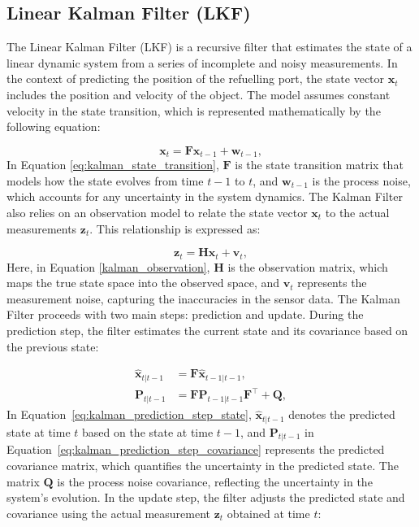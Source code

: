 \documentclass[12pt,oneside]{book} %
\begin{document}
\subsection*{Linear Kalman Filter (LKF)}
\noindent The Linear Kalman Filter (LKF) is a recursive filter that estimates the state of a linear dynamic system from a series of incomplete and noisy measurements. In the context of predicting the position of the refuelling port, the state vector $\mathbf{x}_t$ includes the position and velocity of the object. The model assumes constant velocity in the state transition, which is represented mathematically by the following equation:

\begin{equation}
    \mathbf{x}_t = \mathbf{F} \mathbf{x}_{t-1} + \mathbf{w}_{t-1}, \label{eq:kalman_state_transition}
\end{equation}
In Equation \eqref{eq:kalman_state_transition}, $\mathbf{F}$ is the state transition matrix that models how the state evolves from time $t-1$ to $t$, and $\mathbf{w}_{t-1}$ is the process noise, which accounts for any uncertainty in the system dynamics. The Kalman Filter also relies on an observation model to relate the state
vector $\mathbf{x}_t$ to the actual measurements $\mathbf{z}_t$. This
relationship is expressed as:

\begin{equation}
    \mathbf{z}_t = \mathbf{H} \mathbf{x}_t + \mathbf{v}_t, \label{eq:kalman_observation}
\end{equation}
Here, in Equation \eqref{kalman_observation}, $\mathbf{H}$ is the observation matrix, which maps the true state space into the observed space, and $\mathbf{v}_t$ represents the measurement noise, capturing the inaccuracies in the sensor data.
The Kalman Filter proceeds with two main steps: prediction and update. During
the prediction step, the filter estimates the current state and its covariance
based on the previous state:

\begin{align}
    \hat{\mathbf{x}}_{t|t-1} & = \mathbf{F} \hat{\mathbf{x}}_{t-1|t-1}, \label{eq:kalman_prediction_step_state}                             \\
    \mathbf{P}_{t|t-1}       & = \mathbf{F} \mathbf{P}_{t-1|t-1} \mathbf{F}^\top + \mathbf{Q}, \label{eq:kalman_prediction_step_covariance}
\end{align}
In Equation~\eqref{eq:kalman_prediction_step_state}, $\hat{\mathbf{x}}_{t|t-1}$ denotes the predicted state at time $t$ based on the state at time $t-1$, and $\mathbf{P}_{t|t-1}$ in Equation~\eqref{eq:kalman_prediction_step_covariance} represents the predicted covariance matrix, which quantifies the uncertainty in the predicted state. The matrix $\mathbf{Q}$ is the process noise covariance, reflecting the uncertainty in the system's evolution.
In the update step, the filter adjusts the predicted state and covariance using
the actual measurement $\mathbf{z}_t$ obtained at time $t$:
\end{document}
